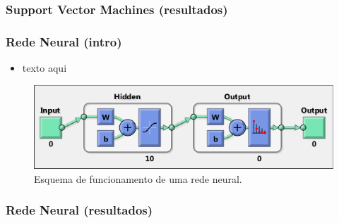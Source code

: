 \documentclass{beamer}
\begin{document}
\begin{frame}

	\frametitle{Support Vector Machines  (resultados)}
	

	
\end{frame}



\begin{frame}

	\frametitle{Rede Neural (intro)}
	
	\begin{minipage}{.45\textwidth}
	
		\begin{itemize}
			\item texto aqui
		\end{itemize}
	
	\end{minipage}
	\begin{minipage}{.5\textwidth}
		\begin{figure}
			\includegraphics[width=\linewidth]{nn01.png}
  			\caption{Esquema de funcionamento de uma rede neural.}
  			\label{fig:nn1}
		\end{figure}
	\end{minipage}
	
\end{frame}





\begin{frame}

	\frametitle{Rede Neural (resultados)}
	
	
	
\end{frame}
\end{document}
